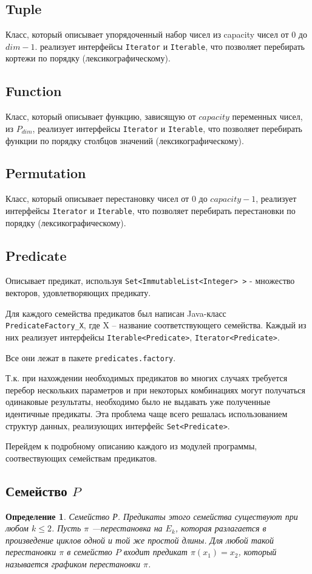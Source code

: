 \documentclass[a4paper,14pt]{extreport}
\newtheorem{opr}{Определение}
\begin{document}
\subsection{Tuple}
Класс, который описывает упорядоченный набор чисел из capacity чисел от $0$ до $dim-1$. реализует интерфейсы {\tt Iterator} и {\tt Iterable}, что позволяет перебирать кортежи по порядку (лексикографическому).
\subsection{Function}
Класс, который описывает функцию, зависящую от $capacity$ переменных чисел, из $P_{dim}$, реализует интерфейсы {\tt Iterator} и {\tt Iterable}, что позволяет перебирать функции по порядку столбцов значений (лексикографическому).
\subsection{Permutation}
Класс, который описывает перестановку чисел от $0$ до $capacity-1$, реализует интерфейсы {\tt Iterator} и {\tt Iterable}, что позволяет перебирать перестановки по порядку (лексикографическому).
\subsection{Predicate} 
Описывает предикат, используя {\tt Set<ImmutableList<Integer> >} - множество векторов, удовлетворяющих предикату.

Для каждого семейства предикатов был написан Java-класс \\{\tt PredicateFactory\_X}, где X – название соответствующего семейства. Каждый из них реализует интерфейсы {\tt Iterable<Predicate>}, {\tt Iterator<Predicate>}.

Все они лежат в пакете {\tt predicates.factory}.

Т.к. при нахождении необходимых предикатов во многих случаях требуется перебор нескольких параметров и при некоторых комбинациях могут получаться  одинаковые результаты, необходимо было не выдавать уже полученные идентичные предикаты. Эта  проблема чаще всего решалась использованием структур данных, реализующих интерфейс {\tt Set<Predicate>}. 

Перейдем к подробному описанию каждого из модулей программы, соотвествующих семействам предикатов.

\subsection{Семейство $P$}
\begin{opr}
Семейство Р. Предикаты этого семейства существуют при любом $k \leqslant 2$. Пусть $\pi$ ---перестановка на $E_k$, которая разлагается в произведение циклов одной и той же простой длины. Для любой такой перестановки $\pi$ в семейство $P$ входит предикат $\pi(x_1)=x_2$, который называется графиком перестановки $\pi$. 
\end{opr}
\end{document}
